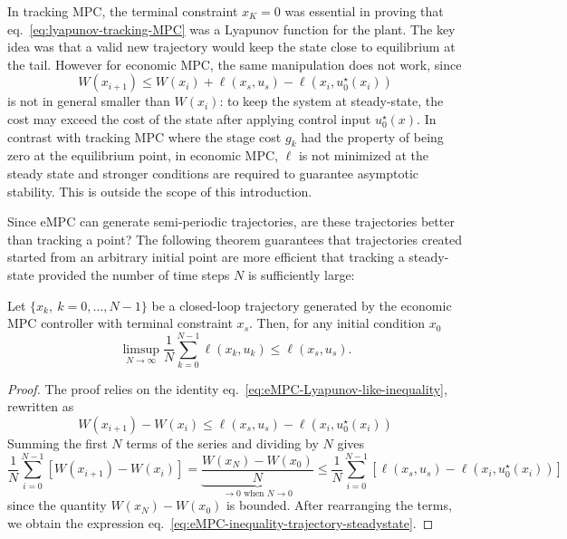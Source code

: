 In tracking MPC, the terminal constraint $x_K=0$ was essential in proving that eq.~\eqref{eq:lyapunov-tracking-MPC} was a Lyapunov function for the plant. The key idea was that a valid new trajectory would keep the state close to equilibrium at the tail. However for economic MPC, the same manipulation does not work, since
\begin{equation}
  \label{eq:eMPC-Lyapunov-like-inequality}
  W(x_{i+1}) \le W(x_i) + \ell(x_s,u_s) - \ell(x_i,u_0^\star(x_i))
\end{equation}
is not in general smaller than $W(x_i)$: to keep the system at steady-state, the cost may exceed the cost of the state after applying control input $u_0^\star(x)$. In contrast with tracking MPC where the stage cost $g_k$ had the property of being zero at the equilibrium point, in economic MPC, $\ell$ is not minimized at the steady state and stronger conditions are required to guarantee asymptotic stability. This is outside the scope of this introduction.

Since eMPC can generate semi-periodic trajectories, are these trajectories better than tracking a point? The following theorem guarantees that trajectories created started from an arbitrary initial point are more efficient that tracking a steady-state provided the number of time steps $N$ is sufficiently large:
\begin{theorem}
  Let $\{x_k,\ k=0,\ldots,N-1\}$ be a closed-loop trajectory generated by the economic MPC controller with terminal constraint $x_s$. Then, for any initial condition $x_0$
  \begin{equation}
    \label{eq:eMPC-inequality-trajectory-steadystate}
    \limsup_{N\rightarrow \infty} \frac{1}{N} \sum_{k=0}^{N-1} \ell(x_k,u_k) \le \ell(x_s,u_s).
  \end{equation}
\end{theorem}
\begin{proof}
  The proof relies on the identity eq.~\eqref{eq:eMPC-Lyapunov-like-inequality}, rewritten as
  \begin{equation*}
    W(x_{i+1}) - W(x_i) \le \ell(x_s,u_s) - \ell(x_i,u_0^\star(x_i))
  \end{equation*}
  Summing the first $N$ terms of the series and dividing by $N$ gives
  \begin{equation*}
    \frac{1}{N}\sum_{i=0}^{N-1} \left[W(x_{i+1}) - W(x_i)\right] = \underbrace{\frac{W(x_N) - W(x_0)}{N}}_{\rightarrow 0 \text{ when } N\rightarrow 0} \le \frac{1}{N}\sum_{i=0}^{N-1}  \left[\ell(x_s,u_s) - \ell(x_i,u_0^\star(x_i))\right]
  \end{equation*}
  since the quantity $W(x_N) - W(x_0)$ is bounded. After rearranging the terms, we obtain the expression eq.~\eqref{eq:eMPC-inequality-trajectory-steadystate}.
\end{proof}

